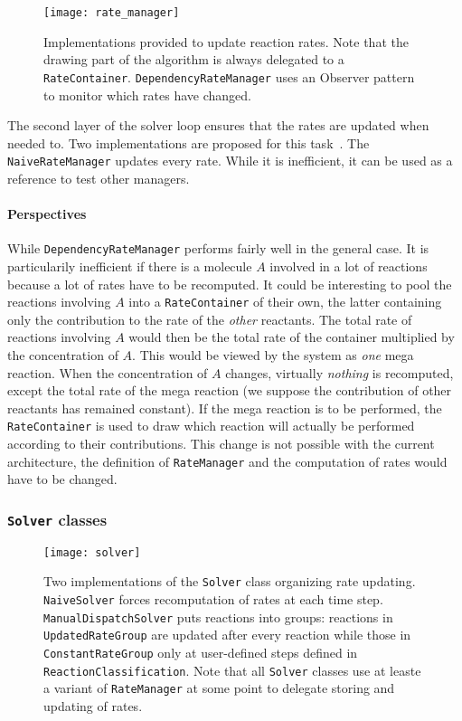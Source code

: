 \begin{figure}[!h]
  \centering
  \texttt{[image: rate\_manager]}
  \caption{Implementations provided to update reaction rates. Note that the drawing part of the algorithm is always delegated to a \texttt{RateContainer}. \texttt{DependencyRateManager} uses an Observer pattern to monitor which rates have changed.}
  \label{fig:rate_container}
\end{figure}

The second layer of the solver loop ensures that the rates are updated when needed to. Two implementations are proposed for this task~. The \texttt{NaiveRateManager} updates every rate. While it is inefficient, it can be used as a reference to test other managers.

\paragraph{Perspectives} While \texttt{DependencyRateManager} performs fairly well in the general case. It is particularily inefficient if there is a molecule $A$ involved in a lot of reactions because a lot of rates have to be recomputed. It could be interesting to pool the reactions involving $A$ into a \texttt{RateContainer} of their own, the latter containing only the contribution to the rate of the \emph{other} reactants. The total rate of reactions involving $A$ would then be the total rate of the container multiplied by the concentration of $A$. This would be viewed by the system as \emph{one} mega reaction. When the concentration of $A$ changes, virtually \emph{nothing} is recomputed, except the total rate of the mega reaction (we suppose the contribution of other reactants has remained constant). If the mega reaction is to be performed, the \texttt{RateContainer} is used to draw which reaction will actually be performed according to their contributions. This change is not possible with the current architecture, the definition of \texttt{RateManager} and the computation of rates would have to be changed.

\subsubsection{\texttt{Solver} classes}

\begin{figure}[!h]
  \centering
  \texttt{[image: solver]}
  \caption{Two implementations of the \texttt{Solver} class organizing rate updating. \texttt{NaiveSolver} forces recomputation of rates at each time step. \texttt{ManualDispatchSolver} puts reactions into groups: reactions in \texttt{UpdatedRateGroup} are updated after every reaction while those in \texttt{ConstantRateGroup} only at user-defined steps defined in \texttt{ReactionClassification}. Note that all \texttt{Solver} classes use at leaste a variant of \texttt{RateManager} at some point to delegate storing and updating of rates.}
  \label{fig:solver_details}
\end{figure}

